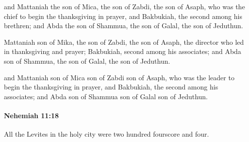 			\begin{versebox}
					\item[BHS] 
					\item[LXX] 
					\item[ASV] and Mattaniah the son of Mica, the son of Zabdi, the son of Asaph, who was the chief to begin the thanksgiving in prayer, and Bakbukiah, the second among his brethren; and Abda the son of Shammua, the son of Galal, the son of Jeduthun.
					\item[NIV] Mattaniah son of Mika, the son of Zabdi, the son of Asaph, the director who led in thanksgiving and prayer; Bakbukiah, second among his associates; and Abda son of Shammua, the son of Galal, the son of Jeduthun.
					\item[NRSV] and Mattaniah son of Mica son of Zabdi son of Asaph, who was the leader to begin the thanksgiving in prayer, and Bakbukiah, the second among his associates; and Abda son of Shammua son of Galal son of Jeduthun.
			\end{versebox}

		\paragraph{Nehemiah 11:18} %
			\label{NEHEMIAH-11-18}

			All the Levites in the holy city were two hundred fourscore and four.

